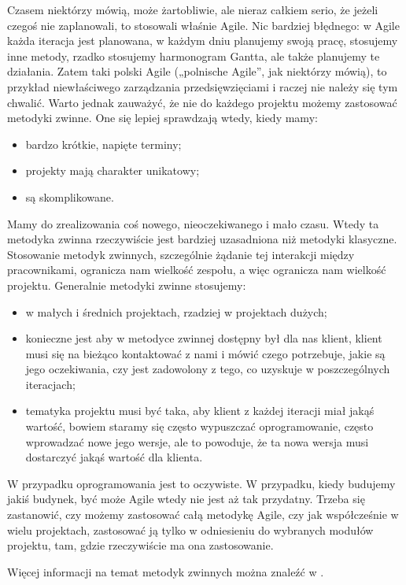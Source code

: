 Czasem niektórzy mówią, może żartobliwie, ale nieraz całkiem serio, że jeżeli czegoś nie zaplanowali,
to stosowali właśnie Agile. Nic bardziej błędnego: w Agile każda iteracja jest planowana,
w każdym dniu planujemy swoją pracę, stosujemy inne metody, rzadko stosujemy harmonogram Gantta,
ale także planujemy te działania. Zatem taki polski Agile („polnische Agile”, jak niektórzy mówią),
to przykład niewłaściwego zarządzania przedsięwzięciami i raczej nie należy się tym chwalić.
Warto jednak zauważyć, że nie do każdego projektu możemy zastosować metodyki zwinne.
One się lepiej sprawdzają wtedy, kiedy mamy:
\begin{itemize}
	\item bardzo krótkie, napięte terminy;
	\item projekty mają charakter unikatowy;
	\item są skomplikowane.
\end{itemize}

Mamy do zrealizowania coś nowego, nieoczekiwanego i mało czasu.
Wtedy ta metodyka zwinna rzeczywiście jest bardziej uzasadniona niż metodyki klasyczne.
Stosowanie metodyk zwinnych, szczególnie żądanie tej interakcji między pracownikami,
ogranicza nam wielkość zespołu, a więc ogranicza nam wielkość projektu.
Generalnie metodyki zwinne stosujemy:
\begin{itemize}
	\item w małych i średnich projektach, rzadziej w projektach dużych;
	\item konieczne jest aby w metodyce zwinnej dostępny był dla nas klient,
	klient musi się na bieżąco kontaktować z nami i mówić czego potrzebuje,
	jakie są jego oczekiwania, czy jest zadowolony z tego, co uzyskuje w poszczególnych iteracjach;
	\item tematyka projektu musi być taka, aby klient z każdej iteracji miał jakąś wartość,
	bowiem staramy się często wypuszczać oprogramowanie, często wprowadzać nowe jego wersje,
	ale to powoduje, że ta nowa wersja musi dostarczyć jakąś wartość dla klienta.
\end{itemize}

W przypadku oprogramowania jest to oczywiste. W przypadku, kiedy budujemy jakiś budynek,
być może Agile wtedy nie jest aż tak przydatny.
Trzeba się zastanowić, czy możemy zastosować całą metodykę Agile,
czy jak współcześnie w wielu projektach, zastosować ją tylko w odniesieniu
do wybranych modułów projektu, tam, gdzie rzeczywiście ma ona zastosowanie.

Więcej informacji na temat metodyk zwinnych można znaleźć w \cite{Cohen_2006}.
